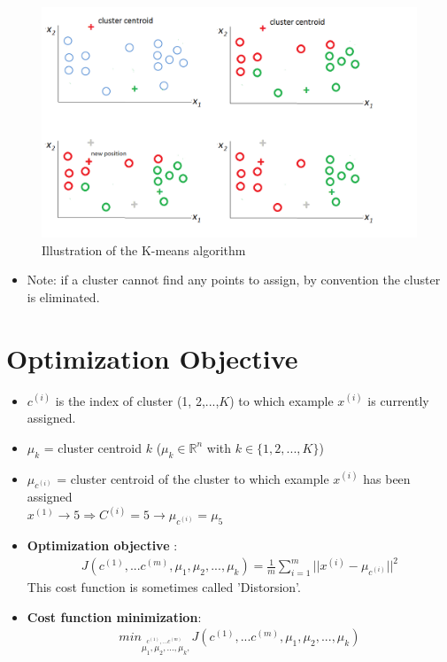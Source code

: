 \documentclass[a4paper,12pt]{report}
\begin{document}
\begin{figure}[H]
	\centering
        \includegraphics[totalheight=6 cm]{fig2.png}\caption{Illustration of the K-means algorithm}
\end{figure}


\begin{itemize}
\item Note: if a cluster cannot find any points to assign, by convention the cluster is eliminated.
\end{itemize}

\section{Optimization Objective}
\begin{itemize}
\item $c^{(i)}$ is the index of cluster (1, 2,...,$K$) to which example $x^{(i)}$ is currently assigned.
\item $\mu_k$ = cluster centroid $k$ ($\mu_k \in \mathbb{R}^n$ with $k \in \{1,2, ..., K \}$)
\item $\mu_{c^{(i)}}$ = cluster centroid of the cluster to which example $x^{(i)}$ has been assigned \\
$x^{(1)} \rightarrow 5  \Rightarrow C^{(i)} = 5 \rightarrow \mu_{c^{(i)}} = \mu_5$ \\
 
\item \textbf{Optimization objective} :\\
\begin{align}
J(c^{(1)}, ...c^{(m)}, \mu_1, \mu_2,..., \mu_k) = \frac{1}{m} \sum_{i=1} ^m ||x^{(i)}- \mu_{c^{(i)}}||^2
\end{align}
This cost function is sometimes called 'Distorsion'. \\
\item \textbf{Cost function minimization}:
\begin{align}
min_{\stackrel{c^{(1)}, ...c^{(m)}}{\mu_1, \mu_2,..., \mu_k}, } J \left(c^{(1)}, ...c^{(m)}, \mu_1, \mu_2,..., \mu_k \right)
\end{align}
\end{itemize}
\end{document}
